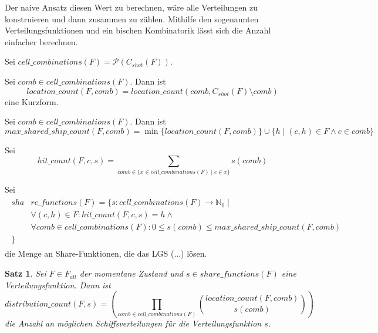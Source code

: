 \documentclass[a4paper,12pt]{llncs}
\numberwithin{equation}{section}
\newtheorem{satz}{Satz}
\begin{document}
Der naive Ansatz diesen Wert zu berechnen, wäre alle Verteilungen zu konstruieren und dann zusammen zu zählen.
Mithilfe den sogenannten Verteilungsfunktionen und ein bischen Kombinatorik lässt sich die Anzahl einfacher berechnen.

\begin{definition}
Sei $cell\_combinations(F)=\mathcal{P}(C_{shot}(F))$.
\end{definition}

\begin{definition}
Sei $comb \in cell\_combinations(F)$. Dann ist
\[
location\_count(F,comb)=location\_count(comb, C_{shot}(F) \setminus comb)
\]
eine Kurzform.
\end{definition}

\begin{definition}
Sei $comb \in cell\_combinations(F)$. Dann ist
\[
max\_shared\_ship\_count(F,comb)=\min\{location\_count(F, comb)\} \cup \{h \mid (c,h) \in F \wedge c \in comb\}
\]
\end{definition}

\begin{definition}
Sei
\[
hit\_count(F, c, s)=\sum_{comb \in \{x \in cell\_combinations(F) \mid c \in x\}}{s(comb)}
\]
\end{definition}

\begin{definition}
Sei
\begin{align}
\begin{split}
sha&re\_functions(F)=\{s \colon cell\_combinations(F) \rightarrow \mathbb{N}_0 \mid\\
&\forall{(c,h) \in F}\colon hit\_count(F, c, s)=h \wedge \\
&\forall{comb \in cell\_combinations(F)} \colon 0 \leq s(comb) \leq max\_shared\_ship\_count(F, comb)\\
\}\;\;\;& \nonumber
\end{split}
\end{align}
die Menge an Share-Funktionen, die das LGS (...) lösen.
\end{definition}

\begin{satz}
Sei $F\in F_{all}$ der momentane Zustand und $s \in share\_functions(F)$ eine Verteilungsfunktion.
Dann ist
\[
distribution\_count(F, s)=
\left( \prod_{comb \in cell\_combinations(F)}{{location\_count(F, comb)\choose s(comb)}} \right)
\]
die Anzahl an möglichen Schiffsverteilungen für die Verteilungsfunktion $s$.
\end{satz}
\end{document}
